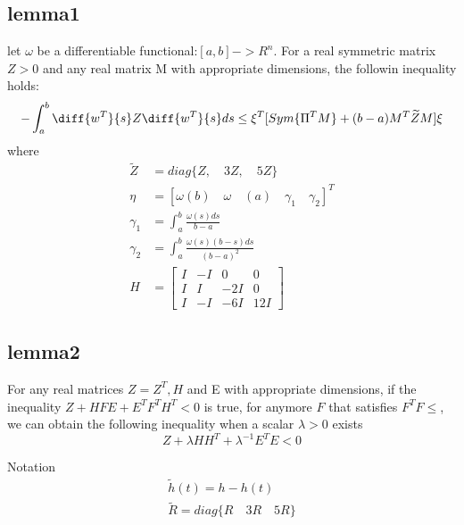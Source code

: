 \documentclass[journal]{IEEEtran}
\begin{document}
 \subsection{lemma1}
 let $\omega$ be a differentiable functional:$[a,b] -> R^n$. For a real symmetric matrix $Z>0$ and any real matrix M with appropriate
 dimensions, the followin inequality holds:
 \begin{equation}
   -\int _a^b \diff{w^T}{s}Z\diff{w^T}{s}ds \leq \xi ^T[Sym\{\Pi ^T M\}+(b-a)M^T\widetilde{Z}M]\xi
 \end{equation}
 where
 \begin{align}
   \widetilde{Z}&=diag\{Z,\quad 3Z,\quad 5Z\} \\
   \eta&=[\omega (b) \quad \omega \quad (a) \quad \gamma _1 \quad \gamma _2]^T \\
   \gamma _1 &= \int _a ^b \frac{\omega (s)ds}{b-a} \\
   \gamma _2 &= \int _a ^b \frac{\omega (s)(b-s)ds}{(b-a)^2} \\
   H &=
   \begin{bmatrix}
     I& -I &0 &0 \\
     I& I &-2I &0 \\
     I& -I &-6I &12I
   \end{bmatrix}
 \end{align}

 \subsection{lemma2}
 For any real matrices $Z=Z^T, H$ and E with appropriate dimensions, if the inequality $Z +HFE+E^TF^TH^T<0$ is true, for anymore
 $F$ that satisfies $F^TF\leq$, we can obtain the following inequality when a scalar $\lambda > 0$ exists
 \begin{equation} 
   Z+\lambda HH^T +\lambda ^{-1}E^TE<0
 \end{equation}

 Notation
 \begin{align}
   \widetilde{h}(t) = h-h(t) \\
   \widetilde{R}=diag\{R \quad 3R \quad 5R\}
 \end{align} 
\end{document}
